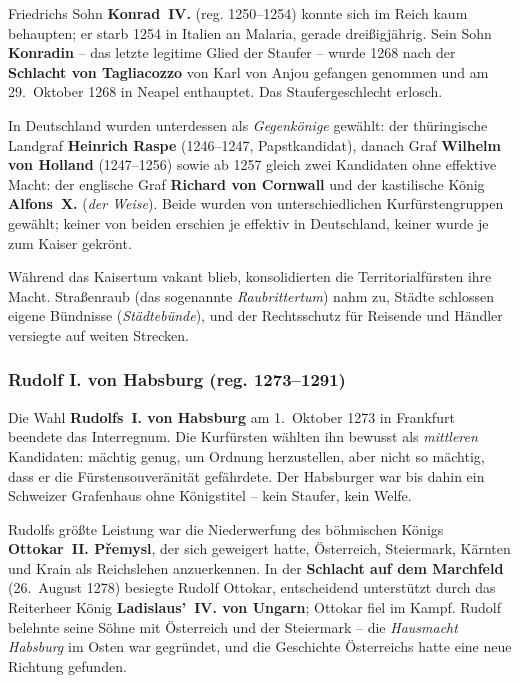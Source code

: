 Friedrichs Sohn \textbf{Konrad~IV.} (reg. 1250--1254) konnte sich im Reich kaum behaupten; er starb 1254 in Italien an Malaria, gerade dreißigjährig. Sein Sohn \textbf{Konradin} -- das letzte legitime Glied der Staufer -- wurde 1268 nach der \textbf{Schlacht von Tagliacozzo} von Karl von Anjou gefangen genommen und am 29.~Oktober 1268 in Neapel enthauptet. Das Staufergeschlecht erlosch.

In Deutschland wurden unterdessen als \textit{Gegenkönige} gewählt: der thüringische Landgraf \textbf{Heinrich Raspe} (1246--1247, Papstkandidat), danach Graf \textbf{Wilhelm von Holland} (1247--1256) sowie ab 1257 gleich zwei Kandidaten ohne effektive Macht: der englische Graf \textbf{Richard von Cornwall} und der kastilische König \textbf{Alfons~X.} (\textit{der Weise}). Beide wurden von unterschiedlichen Kurfürstengruppen gewählt; keiner von beiden erschien je effektiv in Deutschland, keiner wurde je zum Kaiser gekrönt.

Während das Kaisertum vakant blieb, konsolidierten die Territorialfürsten ihre Macht. Straßenraub (das sogenannte \textit{Raubrittertum}) nahm zu, Städte schlossen eigene Bündnisse (\textit{Städtebünde}), und der Rechtsschutz für Reisende und Händler versiegte auf weiten Strecken. \cite{niederstaetter_oesterreich}

\subsubsection{Rudolf I. von Habsburg (reg. 1273--1291)}\label{rudolf_i_von_habsburg}

Die Wahl \textbf{Rudolfs~I. von Habsburg} am 1.~Oktober 1273 in Frankfurt beendete das Interregnum. Die Kurfürsten wählten ihn bewusst als \textit{mittleren} Kandidaten: mächtig genug, um Ordnung herzustellen, aber nicht so mächtig, dass er die Fürstensouveränität gefährdete. Der Habsburger war bis dahin ein Schweizer Grafenhaus ohne Königstitel -- kein Staufer, kein Welfe. \cite{niederstaetter_oesterreich}

Rudolfs größte Leistung war die Niederwerfung des böhmischen Königs \textbf{Ottokar~II. Přemysl}, der sich geweigert hatte, Österreich, Steiermark, Kärnten und Krain als Reichslehen anzuerkennen. In der \textbf{Schlacht auf dem Marchfeld} (26.~August 1278) besiegte Rudolf Ottokar, entscheidend unterstützt durch das Reiterheer König \textbf{Ladislaus'~IV. von Ungarn}; Ottokar fiel im Kampf. Rudolf belehnte seine Söhne mit Österreich und der Steiermark -- die \textit{Hausmacht Habsburg} im Osten war gegründet, und die Geschichte Österreichs hatte eine neue Richtung gefunden. \cite{niederstaetter_oesterreich}

